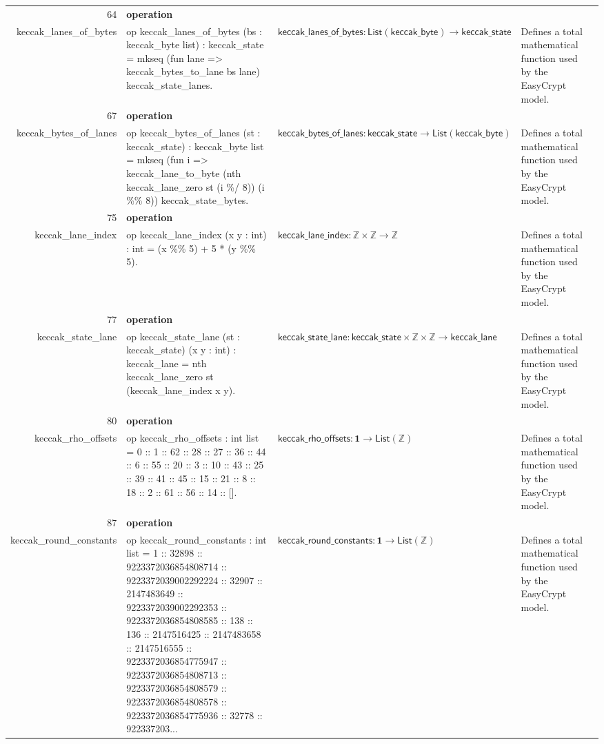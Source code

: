 \documentclass[10pt]{article}
\newcommand{\ec}[1]{\begingroup\ttfamily\scriptsize #1\endgroup}
\begin{document}
\begin{longtable}{r L{0.17\textwidth} L{0.26\textwidth} L{0.27\textwidth} L{0.20\textwidth}}
64 & \textbf{operation}\\\ec{keccak\_lanes\_of\_bytes} & \ec{op keccak\_lanes\_of\_bytes (bs : keccak\_byte list) : keccak\_state = mkseq (fun lane => keccak\_bytes\_to\_lane bs lane) keccak\_state\_lanes.} & \(\mathsf{keccak\_lanes\_of\_bytes} : \mathsf{List}(\mathsf{keccak\_byte}) \to \mathsf{keccak\_state}\) & Defines a total mathematical function used by the EasyCrypt model. \\
67 & \textbf{operation}\\\ec{keccak\_bytes\_of\_lanes} & \ec{op keccak\_bytes\_of\_lanes (st : keccak\_state) : keccak\_byte list = mkseq (fun i => keccak\_lane\_to\_byte (nth keccak\_lane\_zero st (i \%/ 8)) (i \%\% 8)) keccak\_state\_bytes.} & \(\mathsf{keccak\_bytes\_of\_lanes} : \mathsf{keccak\_state} \to \mathsf{List}(\mathsf{keccak\_byte})\) & Defines a total mathematical function used by the EasyCrypt model. \\
75 & \textbf{operation}\\\ec{keccak\_lane\_index} & \ec{op keccak\_lane\_index (x y : int) : int = (x \%\% 5) + 5 * (y \%\% 5).} & \(\mathsf{keccak\_lane\_index} : \mathbb{Z} \times \mathbb{Z} \to \mathbb{Z}\) & Defines a total mathematical function used by the EasyCrypt model. \\
77 & \textbf{operation}\\\ec{keccak\_state\_lane} & \ec{op keccak\_state\_lane (st : keccak\_state) (x y : int) : keccak\_lane = nth keccak\_lane\_zero st (keccak\_lane\_index x y).} & \(\mathsf{keccak\_state\_lane} : \mathsf{keccak\_state} \times \mathbb{Z} \times \mathbb{Z} \to \mathsf{keccak\_lane}\) & Defines a total mathematical function used by the EasyCrypt model. \\
80 & \textbf{operation}\\\ec{keccak\_rho\_offsets} & \ec{op keccak\_rho\_offsets : int list = 0 :: 1 :: 62 :: 28 :: 27 :: 36 :: 44 :: 6 :: 55 :: 20 :: 3 :: 10 :: 43 :: 25 :: 39 :: 41 :: 45 :: 15 :: 21 :: 8 :: 18 :: 2 :: 61 :: 56 :: 14 :: [].} & \(\mathsf{keccak\_rho\_offsets} : \mathbf{1} \to \mathsf{List}(\mathbb{Z})\) & Defines a total mathematical function used by the EasyCrypt model. \\
87 & \textbf{operation}\\\ec{keccak\_round\_constants} & \ec{op keccak\_round\_constants : int list = 1 :: 32898 :: 9223372036854808714 :: 9223372039002292224 :: 32907 :: 2147483649 :: 9223372039002292353 :: 9223372036854808585 :: 138 :: 136 :: 2147516425 :: 2147483658 :: 2147516555 :: 9223372036854775947 :: 9223372036854808713 :: 9223372036854808579 :: 9223372036854808578 :: 9223372036854775936 :: 32778 :: 922337203...} & \(\mathsf{keccak\_round\_constants} : \mathbf{1} \to \mathsf{List}(\mathbb{Z})\) & Defines a total mathematical function used by the EasyCrypt model. \\

\end{longtable}
\end{document}
